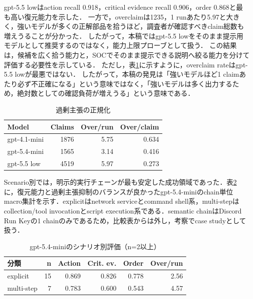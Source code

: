 \documentclass[a4paper,twocolumn,10pt]{article}
\newcommand{\code}[1]{{\small\ttfamily #1}}
\begin{document}
\code{gpt-5.5 low}はaction recall 0.918，critical evidence recall 0.906，order 0.868と最も高い復元能力を示した．
一方で，overclaimは1235，1 runあたり5.97と大きく，強いモデルが多くの正解部品を拾うほど，調査者が確認すべきclaim総数も増えうることが分かった．
したがって，本稿では\code{gpt-5.5 low}をそのまま提示用モデルとして推奨するのではなく，能力上限プローブとして扱う．
この結果は，候補を広く拾う能力と，SOCでそのまま提示できる説明へ絞る能力を分けて評価する必要性を示している．
ただし，表\ref{tab:overclaim_rate}に示すように，overclaim rateは\code{gpt-5.5 low}が最悪ではない．
したがって，本稿の発見は「強いモデルほど1 claimあたり必ず不正確になる」という意味ではなく，「強いモデルは多く出力するため，絶対数としての確認負荷が増えうる」という意味である．

\begin{table}[t]
\centering
\footnotesize
\caption{過剰主張の正規化}
\label{tab:overclaim_rate}
\setlength{\tabcolsep}{2pt}
\begin{tabular}{@{}lrrr@{}}
\toprule
Model & Claims & Over/run & Over/claim \\
\midrule
\code{gpt-4.1-mini} & 1876 & 5.75 & 0.634 \\
\code{gpt-5.4-mini} & 1565 & 3.14 & 0.416 \\
\code{gpt-5.5 low} & 4519 & 5.97 & 0.273 \\
\bottomrule
\end{tabular}
\end{table}


Scenario別では，明示的実行チェーンが最も安定した成功領域であった．表\ref{tab:scenario_result}に，復元能力と過剰主張抑制のバランスが良かった\code{gpt-5.4-mini}のchain単位macro集計を示す．explicitはnetwork serviceとcommand shell系，multi-stepはcollection/tool invocationとscript execution系である．semantic chainはDiscord Run Keyの1 chainのみであるため，比較表からは外し，考察でcase studyとして扱う．

\begin{table}[t]
\centering
\footnotesize
\caption{gpt-5.4-miniのシナリオ別評価（n=2以上）}
\label{tab:scenario_result}
\setlength{\tabcolsep}{2pt}
\begin{tabular}{@{}lrrrrr@{}}
\toprule
分類 & n & Action & Crit. ev. & Order & Over/run \\
\midrule
explicit & 15 & 0.869 & 0.826 & 0.778 & 2.56 \\
multi-step & 7 & 0.783 & 0.600 & 0.543 & 4.57 \\
\bottomrule
\end{tabular}
\end{table}
\end{document}
